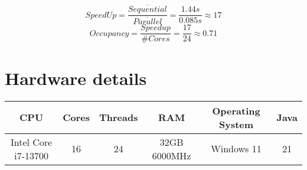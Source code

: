 \documentclass[11pt]{report}
\begin{document}
$$SpeedUp = \frac{\overline{Sequential}}{\overline{Parallel}} = \frac{1.44s}{0.085s} \approx 17 $$
$$Occupancy = \frac{{Speedup}}{\#Cores} = \frac{17}{24} \approx 0.71 $$

\section*{Hardware details}
\begin{tabular}{|c|c|c|c|c|c|}
  \hline
  CPU & Cores & Threads & RAM &  Operating System & Java\\
  \hline
  Intel Core i7-13700 & 16 & 24 & 32GB 6000MHz & Windows 11 & 21\\
  \hline
\end{tabular}
\end{document}
